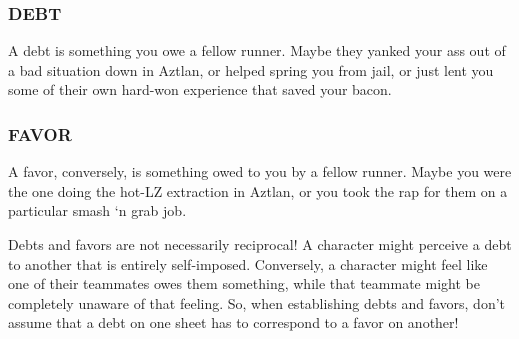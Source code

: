 \documentclass[oneside,10pt]{article}
\begin{document}
\begin{multicols}{2}
\subsubsection{DEBT}
A debt is something you owe a fellow runner. Maybe they
yanked your ass out of a bad situation down in Aztlan, or
helped spring you from jail, or just lent you some of their own
hard-won experience that saved your bacon.

\subsubsection{FAVOR}
A favor, conversely, is something owed to you by a fellow
runner. Maybe you were the one doing the hot-LZ extraction
in Aztlan, or you took the rap for them on a particular smash
‘n grab job.

Debts and favors are not necessarily reciprocal! A character
might perceive a debt to another that is entirely self-imposed.
Conversely, a character might feel like one of their teammates
owes them something, while that teammate might be completely unaware of that feeling. So, when establishing debts
and favors, don’t assume that a debt on one sheet has to
correspond to a favor on another!

\end{multicols}

\newpage

\end{document}
